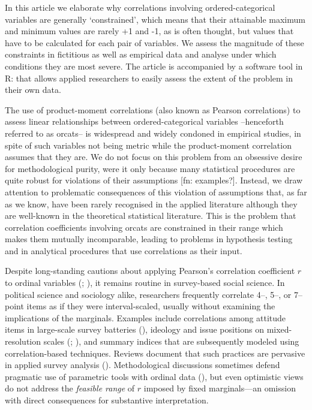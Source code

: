 \documentclass[
  12pt,
]{article}
\theoremstyle{plain}
\theoremstyle{definition}
\theoremstyle{remark}
\begin{document}
In this article we elaborate why correlations involving
ordered-categorical variables are generally `constrained', which means
that their attainable maximum and minimum values are rarely +1 and -1,
as is often thought, but values that have to be calculated for each pair
of variables. We assess the magnitude of these constraints in fictitious
as well as empirical data and analyse under which conditions they are
most severe. The article is accompanied by a software tool in R: that
allows applied researchers to easily assess the extent of the problem in
their own data.

The use of product-moment correlations (also known as Pearson
correlations) to assess linear relationships between ordered-categorical
variables --henceforth referred to as orcats-- is widespread and widely
condoned in empirical studies, in spite of such variables not being
metric while the product-moment correlation assumes that they are. We do
not focus on this problem from an obsessive desire for methodological
purity, were it only because many statistical procedures are quite
robust for violations of their assumptions {[}fn: examples?{]}. Instead,
we draw attention to problematic consequences of this violation of
assumptions that, as far as we know, have been rarely recognised in the
applied literature although they are well-known in the theoretical
statistical literature. This is the problem that correlation
coefficients involving orcats are constrained in their range which makes
them mutually incomparable, leading to problems in hypothesis testing
and in analytical procedures that use correlations as their input.

Despite long-standing cautions about applying Pearson’s correlation coefficient \(r\) to ordinal variables (\autocite{Labovitz1970}; \autocite{Gaito1980}), it remains routine in survey-based social science. In political science and sociology alike, researchers frequently correlate 4–, 5–, or 7–point items as if they were interval-scaled, usually without examining the implications of the marginals. Examples include correlations among attitude items in large-scale survey batteries (\autocite{AlwinKrosnick1991}), ideology and issue positions on mixed-resolution scales (\autocite{BrewerGross2005}; \autocite{KinderKam2009}), and summary indices that are subsequently modeled using correlation-based techniques. Reviews document that such practices are pervasive in applied survey analysis (\autocite{KreuterValliant2007}). Methodological discussions sometimes defend pragmatic use of parametric tools with ordinal data (\autocite{Jacoby1999}), but even optimistic views do not address the \emph{feasible range} of \(r\) imposed by fixed marginals—an omission with direct consequences for substantive interpretation.
\end{document}
